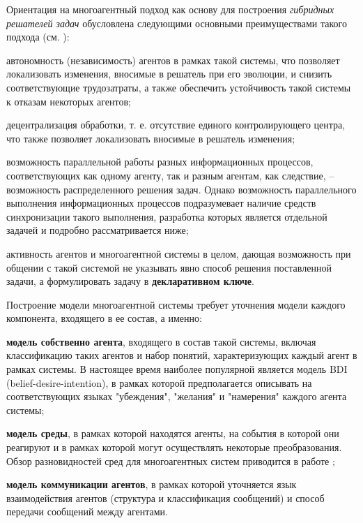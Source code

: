 Ориентация на многоагентный подход как основу для построения \textit{гибридных решателей задач} обусловлена следующими основными преимуществами такого подхода (см. ):
\begin{textitemize}
\item автономность (независимость) агентов в рамках такой системы, что позволяет локализовать изменения, вносимые в решатель при его эволюции, и снизить соответствующие трудозатраты, а также обеспечить устойчивость такой системы к отказам некоторых агентов;
\item децентрализация обработки, т. е. отсутствие единого контролирующего центра, что также позволяет локализовать вносимые в решатель изменения;
\item возможность параллельной работы разных информационных процессов, соответствующих как одному агенту, так и разным агентам, как следствие, -- возможность распределенного решения задач. Однако возможность параллельного выполнения информационных процессов подразумевает наличие средств синхронизации такого выполнения, разработка которых является отдельной задачей и подробно рассматривается ниже;
\item активность агентов и многоагентной системы в целом, дающая возможность при общении с такой системой не указывать явно способ решения поставленной задачи, а формулировать задачу в \textbf{декларативном ключе}.
\end{textitemize}

Построение модели многоагентной системы требует уточнения модели каждого компонента, входящего в ее состав, а именно:
\begin{textitemize}
\item \textbf{модель собственно агента}, входящего в состав такой системы, включая классификацию таких агентов и набор понятий, характеризующих каждый агент в рамках системы. В настоящее время наиболее популярной является модель BDI (belief-desire-intention), в рамках которой предполагается описывать на соответствующих языках "убеждения"{}, "желания"{} и "намерения"{} каждого агента системы;
\item \textbf{модель среды}, в рамках которой находятся агенты, на события в которой они реагируют и в рамках которой могут осуществлять некоторые преобразования. Обзор разновидностей сред для многоагентных систем приводится в работе ;
\item \textbf{модель коммуникации агентов}, в рамках которой уточняется язык взаимодействия агентов (структура и классификация сообщений) и способ передачи сообщений между агентами.
\end{textitemize}

